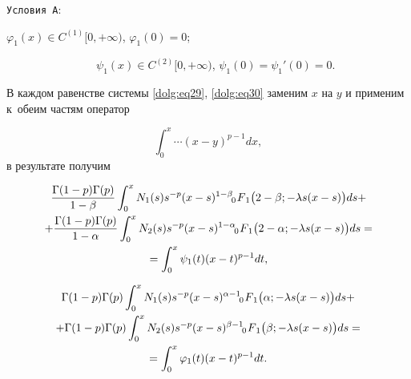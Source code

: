 \texttt{Условия A}:

$\varphi_1(x)\in C^{(1)}[0,+\infty)$, $\varphi_1(0)=0$; \par

{}~~~~~~~~~~~~~~~~$\psi_1(x)\in C^{(2)}[0,+\infty)$, $\psi_1(0)={\psi_1}'(0)=0$.



\smallskip



В каждом равенстве системы \eqref{dolg:eq29}, \eqref{dolg:eq30} заменим $x$ на $y$ и применим к~обеим частям оператор 

$$\int _0^x \cdots (x-y)^{p-1} dx,$$ в результате получим

\begin{multline}\label{dolg:eq31}

\frac{\Gamma(1-p)\Gamma(p)}{1-\beta} \int _0^x N_1(s) s^{-p} (x-s)^{1-\beta}  \,\,

F_{\hspace{-4mm}0 \hspace{3mm}1} \bigl(2-\beta;-\lambda s (x-s)\bigr) ds +

\\

 +\frac{\Gamma(1-p)\Gamma(p)}{1-\alpha}  \int _0^x N_2(s) s^{-p} (x-s)^{1-\alpha}  \,\,

F_{\hspace{-4mm}0 \hspace{3mm}1} \bigl(2-\alpha;-\lambda s (x-s)\bigr) ds =

\\ = \int _0^x \psi_1(t) (x-t)^{p-1} dt, 

\end{multline}

\begin{multline}\label{dolg:eq32}

\Gamma(1-p)\Gamma(p) \int _0^x N_1(s) s^{-p} (x-s)^{\alpha-1}  \,\,

F_{\hspace{-4mm}0 \hspace{3mm}1} \bigl(\alpha;-\lambda s (x-s)\bigr) ds +

\\

 +\Gamma(1-p)\Gamma(p) \int _0^x N_2(s) s^{-p} (x-s)^{\beta-1}  \,\,

F_{\hspace{-4mm}0 \hspace{3mm}1} \bigl(\beta;-\lambda s (x-s)\bigr) ds = \\ = \int _0^x \varphi_1(t) (x-t)^{p-1} dt. 

\end{multline}


